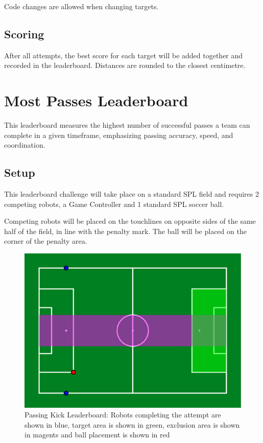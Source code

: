 Code changes are allowed when changing targets.
\subsection{Scoring}
After all attempts, the best score for each target will be added together and recorded in the leaderboard.
Distances are rounded to the closest centimetre.

\section{Most Passes Leaderboard}
This leaderboard measures the highest number of successful passes a team can
complete in a given timeframe, emphasizing passing accuracy, speed, and coordination.

\subsection{Setup}
This leaderboard challenge will take place on a standard SPL field and requires 2 competing robots,
a Game Controller and 1 standard SPL soccer ball.

Competing robots will be placed on the touchlines on opposite sides of the same half of the field,
in line with the penalty mark. The ball will be placed on the corner of the penalty area.

\begin{figure}[t]
    \centerline{\includegraphics[width=\columnwidth]{figs/passing_leaderboard.pdf}}
    \caption{Passing Kick Leaderboard: Robots completing the attempt are shown in blue, target area is shown in green, exclusion area is shown in magents and ball placement is shown in red}
    \label{fig:passing_leaderboard}
\end{figure}

